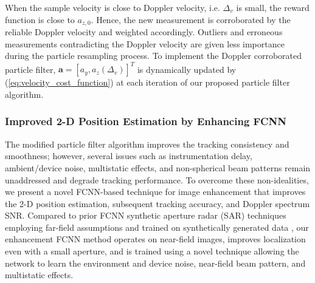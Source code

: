 \documentclass[10pt,journal,final]{IEEEtran}
\begin{document}
When the sample velocity is close to Doppler velocity, i.e. $\Delta_v$ is small, the reward function is close to $a_{z,0}$. 
Hence, the new measurement is corroborated by the reliable Doppler velocity and weighted accordingly. 
Outliers and erroneous measurements contradicting the Doppler velocity are given less importance during the particle resampling process. 
To implement the Doppler corroborated particle filter, $\mathbf{a} = [a_y, a_z(\Delta_v)]^T$  is dynamically updated by (\ref{eq:velocity_cost_function}) at each iteration of our proposed particle filter algorithm.



\subsubsection{Improved 2-D Position Estimation by Enhancing FCNN}
\label{subsubsec:improved_2d_position_esitmation_by_FCNN}
The modified particle filter algorithm improves the tracking consistency and smoothness; however, several issues such as instrumentation delay, ambient/device noise, multistatic effects, and non-spherical beam patterns remain unaddressed and degrade tracking performance. 
To overcome these non-idealities, we present a novel FCNN-based technique for image enhancement that improves the 2-D position estimation, subsequent tracking accuracy, and Doppler spectrum SNR. 
Compared to prior FCNN synthetic aperture radar (SAR) techniques employing far-field assumptions and trained on synthetically generated data \cite{sar_cnn:enhance1}, our enhancement FCNN method operates on near-field images, improves localization even with a small aperture, and is trained using a novel technique allowing the network to learn the environment and device noise, near-field beam pattern, and multistatic effects.
\end{document}
